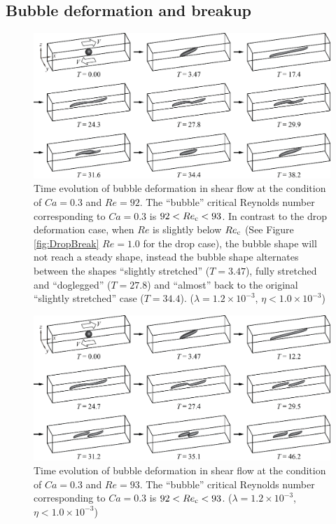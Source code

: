 \documentclass[review]{elsarticle}
\begin{document}
\subsection{Bubble deformation and breakup}
% 
\begin{figure}%
  \centering
  \includegraphics[width=\textwidth]{5-BubbleBreakCa0p3Re92}
  \caption{Time evolution of bubble deformation in shear flow at the
           condition of $Ca=0.3$ and $Re=92$.  
	   The ``bubble'' 
	   critical Reynolds number corresponding to $Ca=0.3$ is
	   $92<Re_{\rm c}<93$.  In contrast to the drop deformation case,
           when $Re$ is slightly below $Re_{\rm c}$
           (See Figure \ref{fig:DropBreak} $Re=1.0$ for the drop case), 
           the bubble shape will
           not reach a steady shape, instead the bubble shape alternates
           between the shapes ``slightly stretched'' ($T=3.47$),
           fully stretched and ``doglegged'' ($T=27.8$) and ``almost''
           back to the original ``slightly stretched'' case 
           ($T=34.4$). 
           ($\lambda = 1.2 \times 10^{-3}$, $\eta < 1.0 \times 10^{-3}$) 
	   }
  \label{fig:BubbleBreakCa0p3Re92}
\end{figure}
%
\begin{figure}%
  \centering
  \includegraphics[width=\textwidth]{6-BubbleBreakCa0p3Re93}
  \caption{Time evolution of bubble deformation in shear flow at the
           condition of $Ca=0.3$ and $Re=93$.
	   The ``bubble'' 
	   critical Reynolds number corresponding to $Ca=0.3$ is
	   $92<Re_{\rm c}<93$.
           ($\lambda = 1.2 \times 10^{-3}$, $\eta < 1.0 \times 10^{-3}$) 
	   }
  \label{fig:BubbleBreakCa0p3Re93}
\end{figure}
\end{document}
